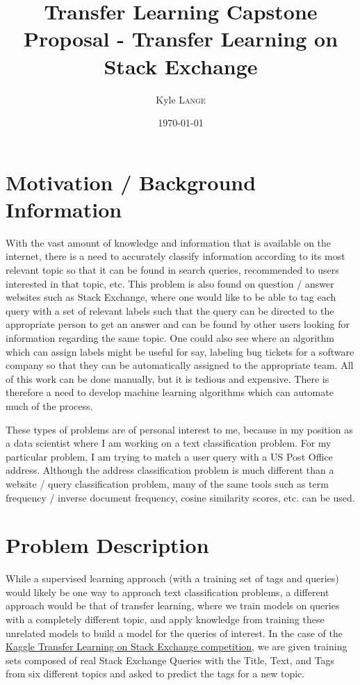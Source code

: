\documentclass{article}
\title{Transfer Learning Capstone Proposal - Transfer Learning on Stack Exchange} %
\author{Kyle \textsc{Lange}} %
\date{\today} %
\begin{document}
\maketitle %

\section{Motivation / Background Information}

With the vast amount of knowledge and information that is available on the
internet, there is a need to accurately classify information according to its
most relevant topic so that it can be found in search queries, recommended to
users interested in that topic, etc. This problem is also found on question /
answer websites such as Stack Exchange, where one would like to be able to tag
each query with a set of relevant labels such that the query can be directed
to the appropriate person to get an answer and can be found by other users
looking for information regarding the same topic. One could also see where an
algorithm which can assign labels might be useful for say, labeling bug
tickets for a software company so that they can be automatically assigned to
the appropriate team. All of this work can be done manually, but it is tedious
and expensive. There is therefore a need to develop machine learning algorithms
which can automate much of the process.

These types of problems are of personal interest to me, because in my position
as a data scientist where I am working on a text classification problem. For
my particular problem, I am trying to match a user query with a US Post Office
address. Although the address classification problem is much different than a
website / query classification problem, many of the same tools such as term
frequency / inverse document frequency, cosine similarity scores, etc. can be
used. 


\section{Problem Description}

While a supervised learning approach (with a training set of tags and queries)
would likely be one way to approach text classification problems, a different
approach would be that of transfer learning, where we train models on queries
with a completely different topic, and apply knowledge from training these
unrelated models to build a model for the queries of interest. In the case of
the \href{https://www.kaggle.com/c/transfer-learning-on-stack-exchange-tags}{Kaggle Transfer Learning on Stack Exchange competition}, we are given training
sets composed of real Stack Exchange Queries with the Title, Text, and Tags 
from six different topics and asked to predict the tags for a new topic. 
\end{document}
